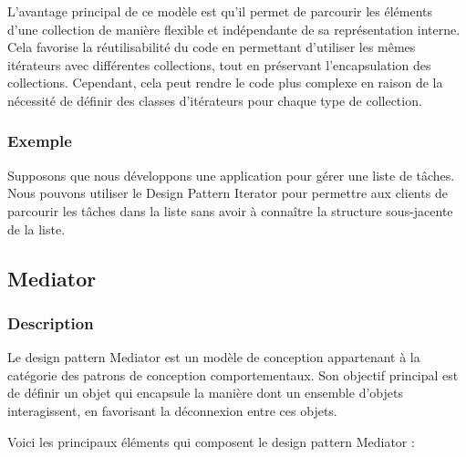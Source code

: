 L'avantage principal de ce modèle est qu'il permet de parcourir les éléments d'une collection de manière flexible et indépendante de sa représentation interne. Cela favorise la réutilisabilité du code en permettant d'utiliser les mêmes itérateurs avec différentes collections, tout en préservant l'encapsulation des collections. Cependant, cela peut rendre le code plus complexe en raison de la nécessité de définir des classes d'itérateurs pour chaque type de collection.


\subsubsection{Exemple}

Supposons que nous développons une application pour gérer une liste de tâches. Nous pouvons utiliser le Design Pattern Iterator pour permettre aux clients de parcourir les tâches dans la liste sans avoir à connaître la structure sous-jacente de la liste.




\newpage

\subsection{Mediator}

\subsubsection{Description}

Le design pattern Mediator est un modèle de conception appartenant à la catégorie des patrons de conception comportementaux. Son objectif principal est de définir un objet qui encapsule la manière dont un ensemble d'objets interagissent, en favorisant la déconnexion entre ces objets.

Voici les principaux éléments qui composent le design pattern Mediator :


